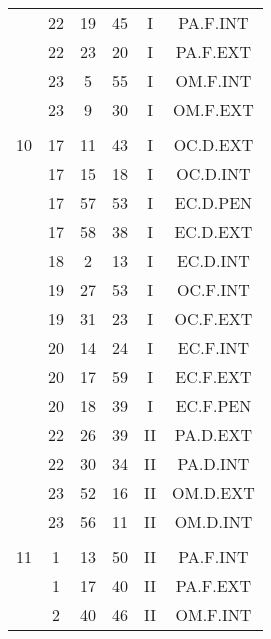 \documentclass[12pt, a4paper]{article}
\begin{document}
\begin{multicols}{3}
{\begin{tabular}{c c c c c c}
	 	 	 	 & 22 & 19 & 45 & I & PA.F.INT\\%
	 	 	 	 & 22 & 23 & 20 & I & PA.F.EXT\\%
	 	 	 	 & 23 & 5 & 55 & I & OM.F.INT\\%
	 	 	 	 & 23 & 9 & 30 & I & OM.F.EXT\\%
	 	 	 	 & & & & & \\%
	 	 	 	10 & 17 & 11 & 43 & I & OC.D.EXT\\%
	 	 	 	 & 17 & 15 & 18 & I & OC.D.INT\\%
	 	 	 	 & 17 & 57 & 53 & I & EC.D.PEN\\%
	 	 	 	 & 17 & 58 & 38 & I & EC.D.EXT\\%
	 	 	 	 & 18 & 2 & 13 & I & EC.D.INT\\%
	 	 	 	 & 19 & 27 & 53 & I & OC.F.INT\\%
	 	 	 	 & 19 & 31 & 23 & I & OC.F.EXT\\%
	 	 	 	 & 20 & 14 & 24 & I & EC.F.INT\\%
	 	 	 	 & 20 & 17 & 59 & I & EC.F.EXT\\%
	 	 	 	 & 20 & 18 & 39 & I & EC.F.PEN\\%
	 	 	 	 & 22 & 26 & 39 & II & PA.D.EXT\\%
	 	 	 	 & 22 & 30 & 34 & II & PA.D.INT\\%
	 	 	 	 & 23 & 52 & 16 & II & OM.D.EXT\\%
	 	 	 	 & 23 & 56 & 11 & II & OM.D.INT\\%
	 	 	 	 & & & & & \\%
	 	 	 	11 & 1 & 13 & 50 & II & PA.F.INT\\%
	 	 	 	 & 1 & 17 & 40 & II & PA.F.EXT\\%
	 	 	 	 & 2 & 40 & 46 & II & OM.F.INT\\%

\end{tabular}}
\end{multicols}
\end{document}
